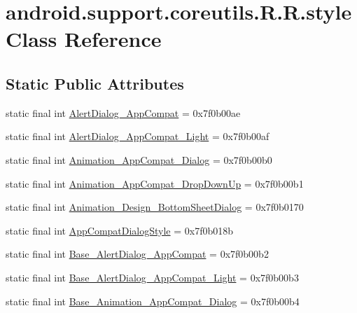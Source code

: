 \hypertarget{classandroid_1_1support_1_1coreutils_1_1_r_1_1style}{
\section{android.support.coreutils.R.R.style Class Reference}
\label{classandroid_1_1support_1_1coreutils_1_1_r_1_1style}
}
\subsection*{Static Public Attributes}
\begin{CompactItemize}
\item 
static final int \hyperlink{classandroid_1_1support_1_1coreutils_1_1_r_1_1style_a6f3c49ae3b70396813bf5151eca2d09}{AlertDialog\_\-AppCompat} = 0x7f0b00ae
\item 
static final int \hyperlink{classandroid_1_1support_1_1coreutils_1_1_r_1_1style_86e3a6c500fe35578bdd4f8b965f12a3}{AlertDialog\_\-AppCompat\_\-Light} = 0x7f0b00af
\item 
static final int \hyperlink{classandroid_1_1support_1_1coreutils_1_1_r_1_1style_6d8d326fa397bb775163a2deec8310e5}{Animation\_\-AppCompat\_\-Dialog} = 0x7f0b00b0
\item 
static final int \hyperlink{classandroid_1_1support_1_1coreutils_1_1_r_1_1style_a1ac6574734ffff869d944ecf5f85c7c}{Animation\_\-AppCompat\_\-DropDownUp} = 0x7f0b00b1
\item 
static final int \hyperlink{classandroid_1_1support_1_1coreutils_1_1_r_1_1style_3a4a0d6034b41aac06dc27408d1933b7}{Animation\_\-Design\_\-BottomSheetDialog} = 0x7f0b0170
\item 
static final int \hyperlink{classandroid_1_1support_1_1coreutils_1_1_r_1_1style_ee0335639e01c21e3fdf17ada971a925}{AppCompatDialogStyle} = 0x7f0b018b
\item 
static final int \hyperlink{classandroid_1_1support_1_1coreutils_1_1_r_1_1style_42e3bf44d332272695d41eaa7eb46652}{Base\_\-AlertDialog\_\-AppCompat} = 0x7f0b00b2
\item 
static final int \hyperlink{classandroid_1_1support_1_1coreutils_1_1_r_1_1style_69414bc7f9d64b6a855809189fc2768e}{Base\_\-AlertDialog\_\-AppCompat\_\-Light} = 0x7f0b00b3
\item 
static final int \hyperlink{classandroid_1_1support_1_1coreutils_1_1_r_1_1style_af89f8ecc5d645bb242b067b4b7bc14e}{Base\_\-Animation\_\-AppCompat\_\-Dialog} = 0x7f0b00b4
\item 

\end{CompactItemize}
